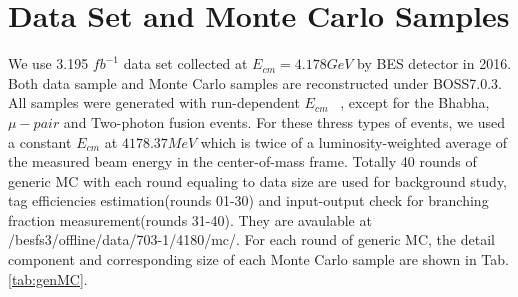 \section{Data Set and Monte Carlo Samples}
We use 3.195 $fb^{-1}$ data set collected at $E_{cm} = 4.178 GeV$ by BES\uppercase\expandafter{} detector in 2016. Both data sample and Monte Carlo samples are reconstructed under BOSS7.0.3. 
All samples were generated with run-dependent $E_{cm}$ ~\cite{DocDB 580-v1}, except for the Bhabha, $\mu-pair$ and Two-photon fusion events.
For these thress types of events, we used a constant $E_{cm}$ at $4178.37MeV$ which is twice of a luminosity-weighted average of the measured beam energy in the center-of-mass frame. 
Totally 40 rounds of generic MC with each round equaling to data size are used for background study, tag efficiencies estimation(rounds 01-30) and input-output check for branching fraction measurement(rounds 31-40). 
They are avaulable at
/besfs3/offline/data/703-1/4180/mc/.
For each round of generic MC, the detail component and corresponding size of each Monte Carlo sample are shown in Tab.\ref{tab:genMC}.
